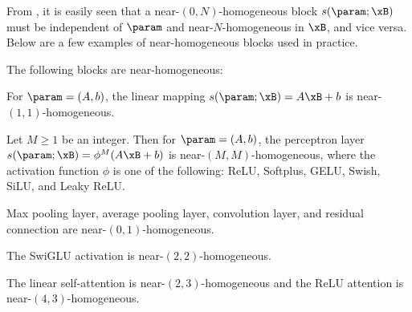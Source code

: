 From , it is easily seen that a near-$(0, N)$-homogeneous block $s(\param; \xB)$ must be independent of $\param$ and near-$N$-homogeneous in $\xB$, and vice versa.
Below are a few examples of near-homogeneous blocks used in practice.
\begin{example}
\label{eg:Examples of dual homogeneous blocks}
The following blocks are near-homogeneous:
\begin{assumpenum}
    \item For $\param = (A, b)$, the linear mapping $s(\param;\xB) = A\xB + b$ is near-$(1,1)$-homogeneous.
    \item Let $M\ge 1$ be an integer. Then for $\param = (A, b)$, the perceptron layer $s(\param; \xB) = \phi^M(A\xB + b)$ is near-$(M, M)$-homogeneous, where the activation function $\phi$ is one of the following: ReLU, Softplus, GELU, Swish, SiLU, and Leaky ReLU.
    \item Max pooling layer, average pooling layer, convolution layer, and residual connection are near-$(0,1)$-homogeneous. %
    \item The SwiGLU activation \citep{shazeer2020glu} is near-$(2,2)$-homogeneous.
    \item The linear self-attention \citep{zhang2024trained} is near-$(2,3)$-homogeneous and the ReLU attention \citep{wortsman2023replacing} is near-$(4,3)$-homogeneous.
\end{assumpenum}
\end{example}

